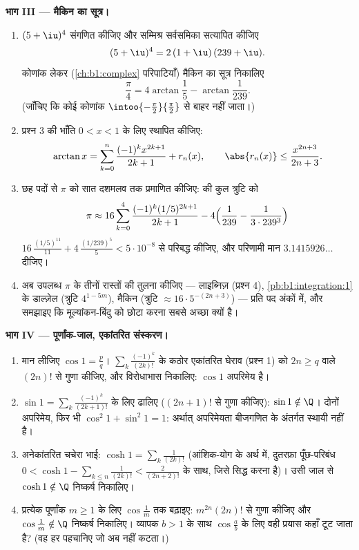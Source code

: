 \begin{problem}
\medskip \noindent\textbf{भाग III --- मैकिन का सूत्र।}
\begin{enumerate}[resume]
  \item $(5 + \iu)^4$ संगणित कीजिए और सम्मिश्र सर्वसमिका सत्यापित कीजिए
        \[
        (5 + \iu)^4 = 2\,(1 + \iu)\,(239 + \iu) .
        \]
        कोणांक लेकर (\cref{ch:b1:complex} परिपाटियाँ) मैकिन का सूत्र निकालिए
        \[
        \frac\pi4 = 4\arctan\frac15 - \arctan\frac{1}{239} .
        \]
        (जाँचिए कि कोई कोणांक $\intoo{-\frac\pi2}{\frac\pi2}$ से बाहर नहीं
        जाता।)
  \item प्रश्न 3 की भाँति $0 < x < 1$ के लिए स्थापित कीजिए:
        \[
        \arctan x = \sum_{k=0}^{n} \frac{(-1)^k
        x^{2k+1}}{2k+1} + r_n(x), \qquad \abs{r_n(x)} \leq
        \frac{x^{2n+3}}{2n+3} .
        \]
  \item छह पदों से $\pi$ को सात दशमलव तक प्रमाणित कीजिए: की कुल त्रुटि को
        \[
        \pi \approx 16\sum_{k=0}^{4}
        \frac{(-1)^k (1/5)^{2k+1}}{2k+1}
        - 4\Bigl(\frac{1}{239} - \frac{1}{3\cdot239^3}\Bigr)
        \]
        $16\,\frac{(1/5)^{11}}{11} + 4\,\frac{(1/239)^5}{5} < 5\cdot10^{-8}$
        से परिबद्ध कीजिए, और परिणामी मान $3.1415926\dots$ दीजिए।
  \item अब उपलब्ध $\pi$ के तीनों रास्तों की तुलना कीजिए --- लाइब्निज़
  (प्रश्न 4), \cref{pb:b1:integration:1} के डाल्ज़ेल  (त्रुटि
  $4^{1-5m}$), मैकिन (त्रुटि $\approx 16\cdot 5^{-(2n+3)}$) --- प्रति पद
  अंकों में, और समझाइए कि मूल्यांकन-बिंदु को छोटा करना सबसे अच्छा क्यों है।
\end{enumerate}

\medskip \noindent\textbf{भाग IV --- पूर्णांक-जाल, एकांतरित संस्करण।}
\begin{enumerate}[resume]
  \item मान लीजिए $\cos 1 = \frac pq$। $\sum_{k} \frac{(-1)^k}{(2k)!}$ के
  कठोर एकांतरित घेराव (प्रश्न 1) को $2n \geq q$ वाले $(2n)!$ से गुणा कीजिए,
  और विरोधाभास निकालिए: $\cos 1$ अपरिमेय है।
  \item $\sin 1 = \sum_k \frac{(-1)^k}{(2k+1)!}$ के लिए ढालिए ($(2n+1)!$ से
  गुणा कीजिए): $\sin 1 \notin \Q$। दोनों अपरिमेय, फिर भी $\cos^2 1 + \sin^2
  1 = 1$: अर्थात् अपरिमेयता बीजगणित के अंतर्गत स्थायी नहीं है।
  \item अनेकांतरित चचेरा भाई: $\cosh 1 = \sum_k \frac{1}{(2k)!}$ (आंशिक-योग
  के अर्थ में, दुतरफ़ा पूँछ-परिबंध $0 < \cosh 1 - \sum_{k \leq n}
  \frac{1}{(2k)!} < \frac{2}{(2n+2)!}$ के साथ, जिसे सिद्ध करना है)। उसी जाल
  से $\cosh 1 \notin \Q$ निष्कर्ष निकालिए।
  \item प्रत्येक पूर्णांक $m \geq 1$ के लिए $\cos\frac 1m$ तक बढ़ाइए:
  $m^{2n}(2n)!$ से गुणा कीजिए और $\cos\frac1m \notin \Q$ निष्कर्ष निकालिए।
  व्यापक $b > 1$ के साथ $\cos\frac ab$ के लिए वही प्रयास कहाँ टूट जाता है?
  (वह हर पहचानिए जो अब नहीं कटता।)
\end{enumerate}


\end{problem}
